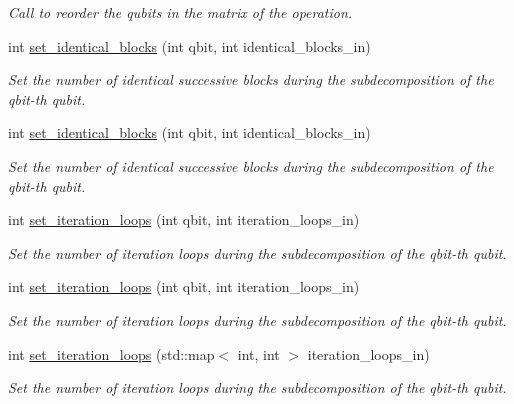 \begin{DoxyCompactItemize}
\begin{DoxyCompactList}\small\item\em Call to reorder the qubits in the matrix of the operation. \end{DoxyCompactList}\item 
int \hyperlink{class_n___qubit___decomposition_a425313eac156f97abc2581c7350c16b4}{set\+\_\+identical\+\_\+blocks} (int qbit, int identical\+\_\+blocks\+\_\+in)
\begin{DoxyCompactList}\small\item\em Set the number of identical successive blocks during the subdecomposition of the qbit-\/th qubit. \end{DoxyCompactList}\item 
int \hyperlink{class_n___qubit___decomposition_a425313eac156f97abc2581c7350c16b4}{set\+\_\+identical\+\_\+blocks} (int qbit, int identical\+\_\+blocks\+\_\+in)
\begin{DoxyCompactList}\small\item\em Set the number of identical successive blocks during the subdecomposition of the qbit-\/th qubit. \end{DoxyCompactList}\item 
int \hyperlink{class_decomposition___base_aaf2862ee2211dac36242551340190b4b}{set\+\_\+iteration\+\_\+loops} (int qbit, int iteration\+\_\+loops\+\_\+in)
\begin{DoxyCompactList}\small\item\em Set the number of iteration loops during the subdecomposition of the qbit-\/th qubit. \end{DoxyCompactList}\item 
int \hyperlink{class_decomposition___base_aaf2862ee2211dac36242551340190b4b}{set\+\_\+iteration\+\_\+loops} (int qbit, int iteration\+\_\+loops\+\_\+in)
\begin{DoxyCompactList}\small\item\em Set the number of iteration loops during the subdecomposition of the qbit-\/th qubit. \end{DoxyCompactList}\item 
int \hyperlink{class_decomposition___base_aa376f8cfdb1b9ed06bceff9c72ddf496}{set\+\_\+iteration\+\_\+loops} (std\+::map$<$ int, int $>$ iteration\+\_\+loops\+\_\+in)
\begin{DoxyCompactList}\small\item\em Set the number of iteration loops during the subdecomposition of the qbit-\/th qubit. \end{DoxyCompactList}\item 

\end{DoxyCompactItemize}
